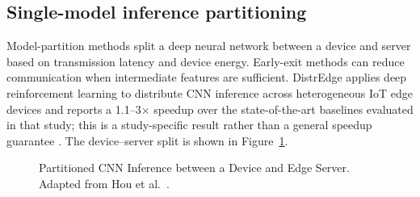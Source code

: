 \documentclass[12pt,a4paper,oneside]{report}
\begin{document}
\subsection{Single-model inference partitioning}

Model-partition methods split a deep neural network between a device and
server based on transmission latency and device energy. Early-exit methods
can reduce communication when intermediate features are sufficient.
DistrEdge applies deep reinforcement learning to distribute CNN inference
across heterogeneous IoT edge devices and reports a 1.1--3$\times$ speedup
over the state-of-the-art baselines evaluated in that study; this is a
study-specific result rather than a general speedup guarantee
\cite{hou2022}. The device--server split is shown in
Figure~\ref{fig:partitioned-collaborative-inference}.

\begin{figure}[H]
  \centering
  \caption[Partitioned CNN Inference between a Device and Edge Server]{Partitioned CNN Inference between a Device and Edge Server. Adapted from Hou et al.\ \cite{hou2022}.}
  \label{fig:partitioned-collaborative-inference}
\end{figure}
\end{document}
